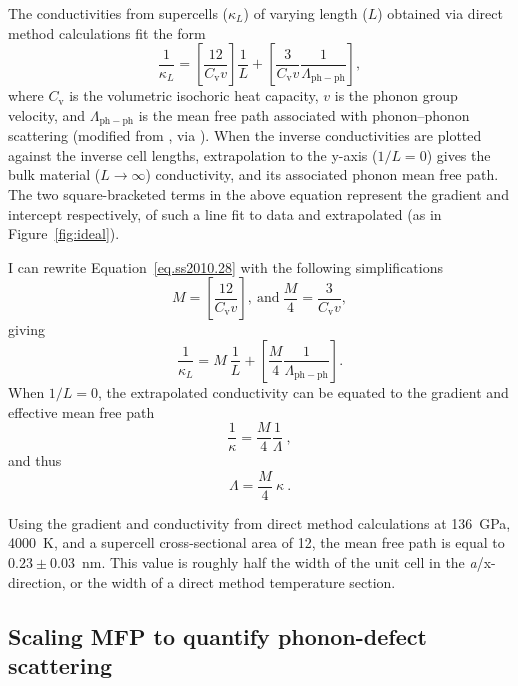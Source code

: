 The conductivities from supercells ($\kappa_{L}$) of varying length ($L$) obtained via direct method calculations fit the form
%
\begin{equation} 
\frac{1}{\kappa_{L}}=\left [ \frac{12}{C_{\mathrm{v}}v} \right ]\frac{1}{L}+\left [ \frac{3}{C_{\mathrm{v}}v} \frac{1}{\Lambda_{\mathrm{ph-ph}}} \right ],
\label{eq.ss2010.28}
\end{equation}
%
where $C_{\mathrm{v}}$ is the volumetric isochoric heat capacity, $v$ is the phonon group velocity, and $\Lambda_{\mathrm{ph-ph}}$ is the mean free path associated with phonon--phonon scattering (modified from \cite{Schelling2002}, via \cite{Stackhouse2010}). When the inverse conductivities are plotted against the inverse cell lengths, extrapolation to the y-axis ($1/L = 0$) gives the bulk material ($L\rightarrow \infty$) conductivity, and its associated phonon mean free path. The two square-bracketed terms in the above equation represent the gradient and intercept respectively, of such a line fit to data and extrapolated (as in Figure~\ref{fig:ideal}). 

I can rewrite Equation~\ref{eq.ss2010.28} with the following simplifications 
%
$$M = \left [ \frac{12}{C_{\mathrm{v}}v} \right ],\ \mathrm{and}\ \frac{M}{4}= \frac{3}{C_{\mathrm{v}}v},$$
%
giving
%
\begin{equation} 
\frac{1}{\kappa_{L}}= M\ \frac{1}{L}+\left [ \frac{M}{4} \frac{1}{\Lambda_{\mathrm{ph-ph}}} \right ]. 
\label{eq.ss2010.28_simp}
\end{equation}
%
When $1/L = 0$, the extrapolated conductivity can be equated to the gradient and effective mean free path
%
$$ \frac{1}{\kappa}=  \frac{M}{4} \frac{1}{\Lambda}\ ,$$
%
and thus 
%
\begin{equation}
\Lambda = \frac{M}{4}\ \kappa \ .
\label{eq.ss2010.28_rearr.}
\end{equation}

Using the gradient and conductivity from direct method calculations at 136~GPa, 4000~K, and a supercell cross-sectional area of 12, the mean free path is equal to $0.23\pm0.03$~nm. This value is roughly half the width of the unit cell in the \textit{a}/x-direction, or the width of a direct method temperature section.



\subsection{Scaling MFP to quantify phonon-defect scattering}

